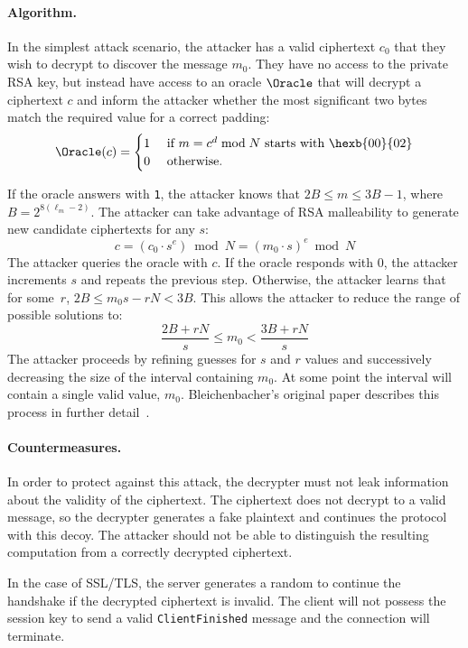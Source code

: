 \paragraph{Algorithm.}
In the simplest attack scenario, the attacker has a valid \PKCS
ciphertext $c_{0}$ that they wish to decrypt to discover the message
$m_{0}$.  They have no access to the private RSA key, but instead have
access to an oracle $\Oracle$ that will decrypt a ciphertext $c$ and
inform the attacker whether the most significant two bytes match
the required value for a correct \PKCS padding:
\begin{equation*} 
\Oracle(c) =  
\begin{cases} 
1 & \text{ if } m=c^d \bmod N \text{ starts with \hexb{00}{02}} \\ 
0 & \text{ otherwise.} 
\end{cases} 
\end{equation*} 

If the oracle answers with \texttt{1}, the attacker knows that $2B
\leq m \leq 3B-1$, where $B = 2^{8(\ell_m-2)}$.  The attacker can
take advantage of RSA malleability to generate new candidate ciphertexts
for any $s$:
\[
c = (c_{0} \cdot s^e) \bmod N = (m_{0} \cdot s)^e \bmod N 
\]
The attacker queries the oracle with $c$. If the oracle responds with
$0$, the attacker increments $s$ and repeats the previous
step. Otherwise, the attacker learns that for some~$r$, $2B \leq m_{0}s - rN  < 3B$. This allows the attacker to reduce the range of possible solutions to:  
\[ 
\frac{2B+rN}{s} \leq m_{0} < \frac{3B+rN}{s}  
\] 
The attacker proceeds by refining guesses for $s$ and $r$ values and
successively decreasing the size of the interval containing $m_{0}$.  At
some point the interval will contain a single valid value, $m_{0}$.
Bleichenbacher's original paper describes this process in further
detail~\cite{bleichenbacher-1998}.

\paragraph{Countermeasures.}
In order to protect against this attack, the decrypter must not leak
information about the \PKCS validity of the ciphertext.  The
ciphertext does not decrypt to a valid message, so the
decrypter generates a fake plaintext and continues the
protocol with this decoy.  The attacker should not be able to
distinguish the resulting computation from a correctly decrypted
ciphertext.

In the case of SSL/TLS, the server generates a random \pms to continue
the handshake if the decrypted ciphertext is
invalid.  The client will not possess the session key to send a valid
\texttt{ClientFinished} message and the connection will terminate.

